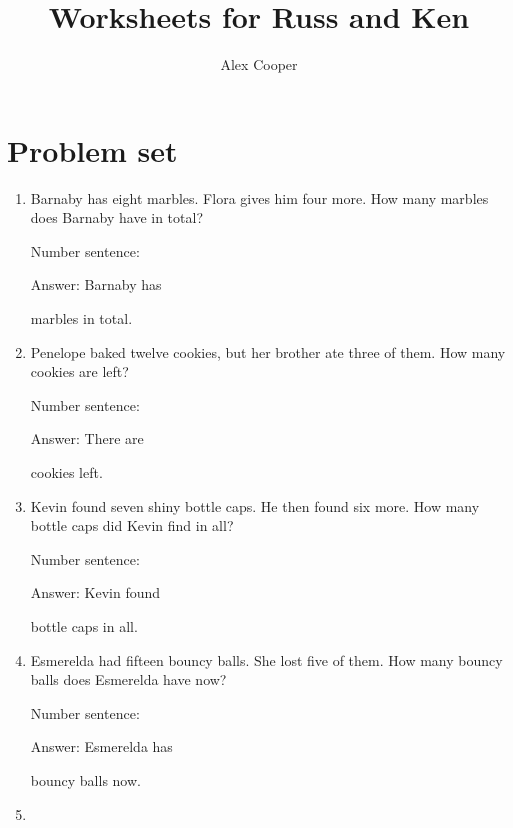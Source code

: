 \documentclass{tufte-book}
\title{Worksheets for Russ and Ken}
\author[Alex Cooper]{Alex Cooper}
\begin{document}
\frontmatter

\maketitle


\clearpage\section{Problem set }

\begin{enumerate}

\item
  Barnaby has eight marbles. Flora gives him four more. How many marbles
  does Barnaby have in total?\medskip\par
  Number sentence:
  \dotfill\medskip\par
  Answer: Barnaby has
  \dotfill\medskip\par\mbox{}\dotfill\medskip\par\mbox{}\dotfill\bigskip
  marbles in total.
\item
  Penelope baked twelve cookies, but her brother ate three of them. How
  many cookies are left?\medskip\par
  Number sentence:
  \dotfill\medskip\par
  Answer: There are
  \dotfill\medskip\par\mbox{}\dotfill\medskip\par\mbox{}\dotfill\bigskip
  cookies left.
\item
  Kevin found seven shiny bottle caps. He then found six more. How many
  bottle caps did Kevin find in all?\medskip\par
  Number sentence:
  \dotfill\medskip\par
  Answer: Kevin found
  \dotfill\medskip\par\mbox{}\dotfill\medskip\par\mbox{}\dotfill\bigskip
  bottle caps in all.
\item
  Esmerelda had fifteen bouncy balls. She lost five of them. How many
  bouncy balls does Esmerelda have now?\medskip\par
  Number sentence:
  \dotfill\medskip\par
  Answer: Esmerelda has
  \dotfill\medskip\par\mbox{}\dotfill\medskip\par\mbox{}\dotfill\bigskip
  bouncy balls now.
\item

\end{enumerate}
\end{document}
